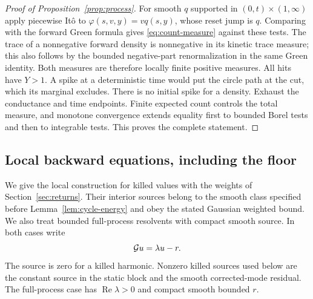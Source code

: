 \begin{proof}[Proof of Proposition~\ref{prop:process}]
For smooth $q$ supported in $(0,t)\times(1,\infty)$ apply
piecewise It\^o to $\varphi(s,v,y)=vq(s,y)$, whose reset jump
is $q$. Comparing with the forward Green formula gives
\eqref{eq:count-measure} against these tests. The trace of a
nonnegative forward density is nonnegative in its kinetic
trace measure; this also follows by the bounded negative-part
renormalization in the same Green identity. Both measures are
therefore locally finite positive measures. All hits have
$Y>1$. A spike at a deterministic time would put the circle
path at the cut, which its marginal excludes. There is no
initial spike for a density. Exhaust the conductance and
time endpoints. Finite expected count controls the total
measure, and monotone convergence extends equality first to
bounded Borel tests and then to integrable tests. This proves
the complete statement.
\end{proof}

\subsection{Local backward equations, including the floor}

We give the local construction for killed values with the weights
of Section~\ref{sec:returns}. Their interior sources belong to the
smooth class specified before Lemma~\ref{lem:cycle-energy} and obey
the stated Gaussian weighted bound. We also treat bounded
full-process resolvents with compact smooth source.
In both cases write
\begin{equation}\label{eq:backward-source-equation}
 \mathcal G u=\lambda u-r .
\end{equation}
The source is zero for a killed harmonic. Nonzero killed sources
used below are the constant source in the static block and the
smooth corrected-mode residual. The full-process case has
$\operatorname{Re}\lambda>0$ and compact smooth bounded $r$.

